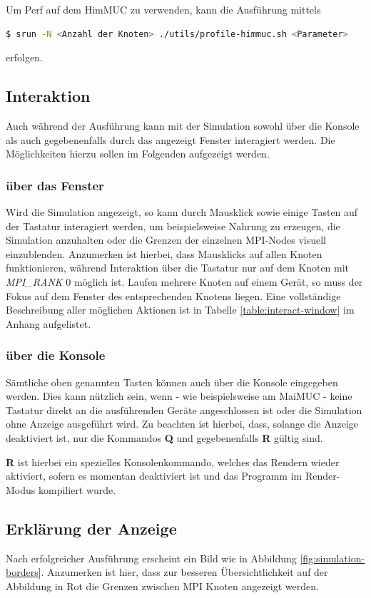 \documentclass[course=erap]{aspdoc}
\begin{document}
Um Perf auf dem HimMUC zu verwenden, kann die Ausführung mittels
\begin{lstlisting}[language=bash]
  $ srun -N <Anzahl der Knoten> ./utils/profile-himmuc.sh <Parameter>
\end{lstlisting}
erfolgen.

\subsection{Interaktion}
Auch während der Ausführung kann mit der Simulation sowohl über die Konsole als auch gegebenenfalls durch das angezeigt Fenster interagiert werden. Die Möglichkeiten hierzu sollen im Folgenden aufgezeigt werden.
\subsubsection{über das Fenster}
\label{sssec:interact-render}
Wird die Simulation angezeigt, so kann durch Mausklick sowie einige Tasten auf der Tastatur interagiert werden, um beispielsweise Nahrung zu erzeugen, die Simulation anzuhalten oder die Grenzen der einzelnen MPI-Nodes visuell einzublenden. Anzumerken ist hierbei, dass Mausklicks auf allen Knoten funktionieren, während Interaktion über die Tastatur nur auf dem Knoten mit \emph{MPI\_RANK} 0 möglich ist. Laufen mehrere Knoten auf einem Gerät, so muss der Fokus auf dem Fenster des entsprechenden Knotens liegen. Eine vollständige Beschreibung aller möglichen Aktionen ist in Tabelle \ref{table:interact-window} im Anhang aufgelistet.

\subsubsection{über die Konsole}
\label{sssec:interact-console}
Sämtliche oben genannten Tasten können auch über die Konsole eingegeben werden. Dies kann nützlich sein, wenn - wie beispielsweise am MaiMUC - keine Tastatur direkt an die ausführenden Geräte angeschlossen ist oder die Simulation ohne Anzeige ausgeführt wird. Zu beachten ist hierbei, dass, solange die Anzeige deaktiviert ist, nur die Kommandos \textbf{Q} und gegebenenfalls \textbf{R} gültig sind.

\textbf{R} ist hierbei ein spezielles Konsolenkommando, welches das Rendern wieder aktiviert, sofern es momentan deaktiviert ist und das Programm im Render-Modus kompiliert wurde.

\subsection{Erklärung der Anzeige}
Nach erfolgreicher Ausführung erscheint ein Bild wie in Abbildung \ref{fig:simulation-borders}. Anzumerken ist hier, dass zur besseren Übersichtlichkeit auf der Abbildung in Rot die Grenzen zwischen MPI Knoten angezeigt werden.
\end{document}
